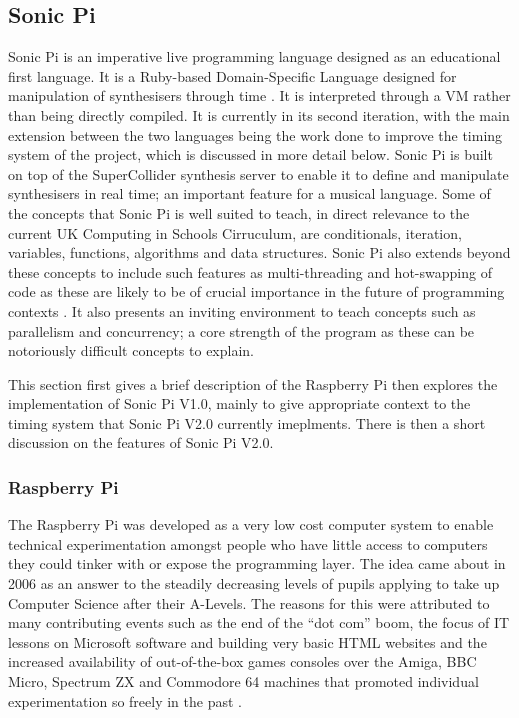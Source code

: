 \documentclass[11pt, abstracton, twoside, titlepage=true]{scrartcl}
\begin{document}
\subsection{Sonic Pi}
Sonic Pi is an imperative live programming language designed as an educational 
first language. It is a Ruby-based Domain-Specific Language designed for 
manipulation of synthesisers through time \cite{AB13}. It is interpreted through 
a VM rather than being directly compiled. It is currently in its 
second iteration, with the main extension between the two languages being the 
work done to improve the timing system of the project, which is discussed in 
more detail below. Sonic Pi is built on top of the SuperCollider synthesis 
server to enable it to define and manipulate synthesisers in real time; an 
important feature for a musical language. Some of the concepts that Sonic Pi 
is well suited to teach, in direct relevance to the current UK Computing in 
Schools Cirruculum, are conditionals, iteration, variables, functions, 
algorithms and data structures. Sonic Pi also extends beyond these concepts to 
include such features as multi-threading and hot-swapping of code as these are 
likely to be of crucial importance in the future of programming contexts \cite{
AOB14}. It also presents an inviting environment to teach concepts such as 
parallelism and concurrency; a core strength of the program as these can be
notoriously difficult concepts to explain.

This section first gives a brief description of the Raspberry Pi then explores 
the implementation of Sonic Pi V1.0, mainly to give appropriate context to the 
timing system that Sonic Pi V2.0 currently imeplments. There is then a 
short discussion on the features of Sonic Pi V2.0.

\subsubsection{Raspberry Pi}
The Raspberry Pi was developed as a very low cost computer system to enable 
technical experimentation amongst people who have little access to computers 
they could tinker with or expose the programming layer. The idea came about in 
2006 as an answer to the steadily decreasing levels of pupils applying to take 
up Computer Science after their A-Levels. The reasons for this were attributed 
to many contributing events such as the end of the ``dot com'' boom, the focus 
of IT lessons on Microsoft software and building very basic HTML websites and 
the increased availability of out-of-the-box games consoles over the Amiga, BBC 
Micro, Spectrum ZX and Commodore 64 machines that promoted individual 
experimentation so freely in the past \cite{rp}.
\end{document}
